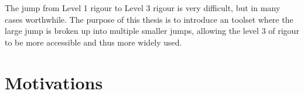 The jump from Level 1 rigour to Level 3 rigour is very difficult, but in many cases worthwhile. The purpose of this thesis is to introduce an toolset where the large jump is broken up into multiple smaller jumps, allowing the level 3 of rigour to be more accessible and thus more widely used. 

\section{Motivations}

%
%
%
%
